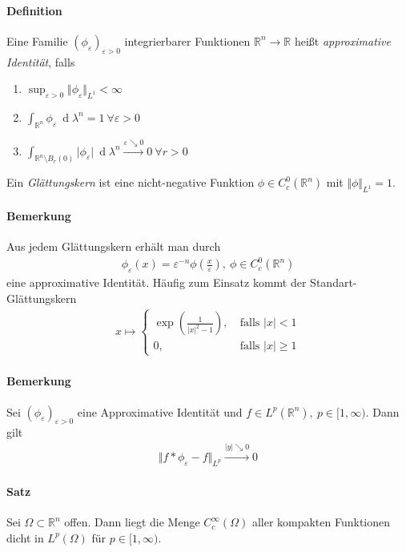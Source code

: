 \documentclass[12pt,a4paper,fleqn]{article}
\def\d{{\operatorname{d}}}
\begin{document}
\paragraph{Definition} Eine Familie $(\phi_\varepsilon)_{\varepsilon > 0}$ integrierbarer Funktionen $\mathbb{R}^n \rightarrow \mathbb{R}$ heißt \textit{approximative Identität}, falls 
\begin{enumerate}
\item $\sup_{\varepsilon > 0} \Vert \phi_\varepsilon \Vert _{L^1}  < \infty$
\item $\int_{\mathbb{R}^n} \phi_\varepsilon\ \d\lambda^n = 1\ \forall\varepsilon>0$
\item$\int_{\mathbb{R}^n\setminus B_r(0)} \vert \phi_\varepsilon\vert\ \d\lambda^n \xrightarrow{\varepsilon\searrow 0} 0\ \forall r > 0$ 
\end{enumerate}
Ein \textit{Glättungskern} ist eine nicht-negative Funktion $\phi \in C^0_c(\mathbb{R}^n)$ mit $\Vert \phi \Vert_{L^1} = 1$.

\paragraph{Bemerkung} Aus jedem Glättungskern erhält man durch
\begin{align*}
\phi_\varepsilon(x) = \varepsilon^{-n} \phi\left(\frac{x}{\varepsilon}\right),\ \phi \in C^0_c (\mathbb{R}^n)
\end{align*}
eine approximative Identität. Häufig zum Einsatz kommt der Standart-Glättungskern
\begin{align*}
x \mapsto \begin{cases}
 \exp \left(\frac{1}{\vert x \vert ^2- 1}\right),&\ \text{falls } \vert x \vert < 1 \\ 0,&\ \text{falls } \vert x \vert \geq 1
\end{cases}
\end{align*}

\paragraph{Bemerkung} Sei $(\phi_\varepsilon)_{\varepsilon > 0}$ eine Approximative Identität und $f \in L^p(\mathbb{R}^n),\ p \in [1, \infty)$. Dann gilt 
\begin{align*}
\Vert f * \phi_\varepsilon -f\Vert_{L^p } \xrightarrow{\vert y \vert \searrow 0} 0 
\end{align*}

\paragraph{Satz} Sei $\Omega \subset \mathbb{R}^n$ offen. Dann liegt die Menge $C^\infty_c (\Omega)$ aller kompakten Funktionen dicht in $L^p(\Omega)$ für $p \in [1, \infty)$.
\end{document}
